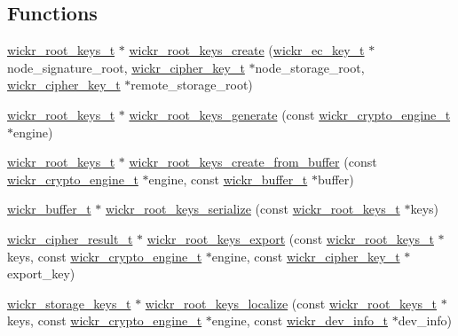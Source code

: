 \subsection*{Functions}
\begin{DoxyCompactItemize}
\item 
\hyperlink{structwickr__root__keys}{wickr\+\_\+root\+\_\+keys\+\_\+t} $\ast$ \hyperlink{group__wickr__root__keys_gab6289774ce4bcbdc08584695f9b7c34c}{wickr\+\_\+root\+\_\+keys\+\_\+create} (\hyperlink{structwickr__ec__key}{wickr\+\_\+ec\+\_\+key\+\_\+t} $\ast$node\+\_\+signature\+\_\+root, \hyperlink{structwickr__cipher__key}{wickr\+\_\+cipher\+\_\+key\+\_\+t} $\ast$node\+\_\+storage\+\_\+root, \hyperlink{structwickr__cipher__key}{wickr\+\_\+cipher\+\_\+key\+\_\+t} $\ast$remote\+\_\+storage\+\_\+root)
\item 
\hyperlink{structwickr__root__keys}{wickr\+\_\+root\+\_\+keys\+\_\+t} $\ast$ \hyperlink{group__wickr__root__keys_gac6d33868c25a85e5da5cff92a4eab189}{wickr\+\_\+root\+\_\+keys\+\_\+generate} (const \hyperlink{structwickr__crypto__engine}{wickr\+\_\+crypto\+\_\+engine\+\_\+t} $\ast$engine)
\item 
\hyperlink{structwickr__root__keys}{wickr\+\_\+root\+\_\+keys\+\_\+t} $\ast$ \hyperlink{group__wickr__root__keys_ga5ab25c65aa25fbe96d978f8e06376653}{wickr\+\_\+root\+\_\+keys\+\_\+create\+\_\+from\+\_\+buffer} (const \hyperlink{structwickr__crypto__engine}{wickr\+\_\+crypto\+\_\+engine\+\_\+t} $\ast$engine, const \hyperlink{structwickr__buffer}{wickr\+\_\+buffer\+\_\+t} $\ast$buffer)
\item 
\hyperlink{structwickr__buffer}{wickr\+\_\+buffer\+\_\+t} $\ast$ \hyperlink{group__wickr__root__keys_ga6875c9f677c4ec127276714976a623a5}{wickr\+\_\+root\+\_\+keys\+\_\+serialize} (const \hyperlink{structwickr__root__keys}{wickr\+\_\+root\+\_\+keys\+\_\+t} $\ast$keys)
\item 
\hyperlink{structwickr__cipher__result}{wickr\+\_\+cipher\+\_\+result\+\_\+t} $\ast$ \hyperlink{group__wickr__root__keys_ga6e3a04e7e1c65ada93450051eb4f4459}{wickr\+\_\+root\+\_\+keys\+\_\+export} (const \hyperlink{structwickr__root__keys}{wickr\+\_\+root\+\_\+keys\+\_\+t} $\ast$keys, const \hyperlink{structwickr__crypto__engine}{wickr\+\_\+crypto\+\_\+engine\+\_\+t} $\ast$engine, const \hyperlink{structwickr__cipher__key}{wickr\+\_\+cipher\+\_\+key\+\_\+t} $\ast$export\+\_\+key)
\item 
\hyperlink{structwickr__storage__keys}{wickr\+\_\+storage\+\_\+keys\+\_\+t} $\ast$ \hyperlink{group__wickr__root__keys_gaa34dd6c85c667b8b7fb025f56c7bcc46}{wickr\+\_\+root\+\_\+keys\+\_\+localize} (const \hyperlink{structwickr__root__keys}{wickr\+\_\+root\+\_\+keys\+\_\+t} $\ast$keys, const \hyperlink{structwickr__crypto__engine}{wickr\+\_\+crypto\+\_\+engine\+\_\+t} $\ast$engine, const \hyperlink{structwickr__dev__info}{wickr\+\_\+dev\+\_\+info\+\_\+t} $\ast$dev\+\_\+info)

\end{DoxyCompactItemize}

